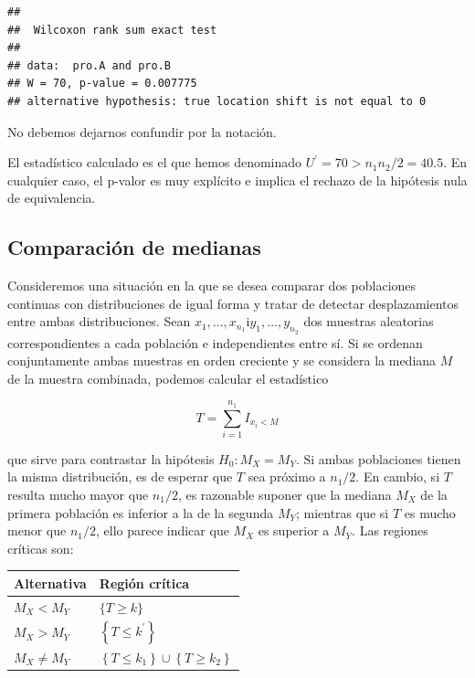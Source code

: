 \documentclass[
]{article}
\begin{document}
\begin{verbatim}
## 
##  Wilcoxon rank sum exact test
## 
## data:  pro.A and pro.B
## W = 70, p-value = 0.007775
## alternative hypothesis: true location shift is not equal to 0
\end{verbatim}

No debemos dejarnos confundir por la notación.

El estadístico calculado es el que hemos denominado \(U^{\prime}=70>n_{1} n_{2} / 2=40.5\). En cualquier caso, el p-valor es muy explícito e implica el rechazo de la hipótesis nula de equivalencia.

\subsection{Comparación de medianas}\label{comparaciuxf3n-de-medianas}

Consideremos una situación en la que se desea comparar dos poblaciones continuas con distribuciones de igual forma y tratar de detectar desplazamientos entre ambas distribuciones.
Sean \(x_{1}, \ldots, x_{n_{1}} \mathrm{i} y_{1}, \ldots, y_{n_{2}}\) dos muestras aleatorias correspondientes a cada población e independientes entre sí. Si se ordenan conjuntamente ambas muestras en orden creciente y se considera la mediana \(M\) de la muestra combinada, podemos calcular el estadístico

\[
T=\sum_{i=1}^{n_{1}} I_{x_{i}<M}
\]

que sirve para contrastar la hipótesis \(H_{0}: M_{X}=M_{Y}\).
Si ambas poblaciones tienen la misma distribución, es de esperar que \(T\) sea próximo a \(n_{1} / 2\). En cambio, si \(T\) resulta mucho mayor que \(n_{1} / 2\), es razonable suponer que la mediana \(M_{X}\) de la primera población es inferior a la de la segunda \(M_{Y}\); mientras que si \(T\) es mucho menor que \(n_{1} / 2\), ello parece indicar que \(M_{X}\) es superior a \(M_{Y}\). Las regiones críticas son:

\begin{longtable}[]{@{}
  >{\raggedright\arraybackslash}p{}
  >{\raggedright\arraybackslash}p{}@{}}
\toprule\noalign{}
\begin{minipage}[b]{\linewidth}\raggedright
Alternativa
\end{minipage} & \begin{minipage}[b]{\linewidth}\raggedright
Región crítica
\end{minipage} \\
\midrule\noalign{}
\endhead
\bottomrule\noalign{}
\endlastfoot
\(M_{X}<M_{Y}\) & \(\{T \geq k\}\) \\
\(M_{X}>M_{Y}\) & \(\left\{T \leq k^{\prime}\right\}\) \\
\(M_{X} \neq M_{Y}\) & \(\left\{T \leq k_{1}\right\} \cup\left\{T \geq k_{2}\right\}\) \\
\end{longtable}
\end{document}
